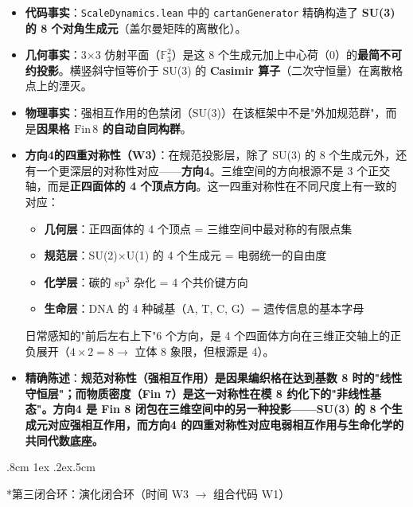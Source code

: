 \documentclass[aps,prd,twocolumn,nofootinbib,floatfix]{revtex4-2}
\makeatletter
\def\subsubsection{%
  \@startsection{subsubsection}{3}{\z@}
    {.8cm \@plus1ex \@minus .2ex}{.5cm}
    {\normalfont\normalsize\bfseries\itshape\raggedright}%
}
\makeatother
\begin{document}
\begin{itemize}
    \item \textbf{代码事实}：\texttt{ScaleDynamics.lean} 中的 \texttt{cartanGenerator} 精确构造了 \textbf{SU(3) 的 8 个对角生成元}（盖尔曼矩阵的离散化）。
    \item \textbf{几何事实}：3$\times$3 仿射平面（$\mathbb{F}_3^2$）是这 8 个生成元加上中心荷（0）的\textbf{最简不可约投影}。横竖斜守恒等价于 SU(3) 的 \textbf{Casimir 算子}（二次守恒量）在离散格点上的湮灭。
    \item \textbf{物理事实}：强相互作用的色禁闭（SU(3)）在该框架中不是"外加规范群"，而是\textbf{因果格 $\text{Fin}\,8$ 的自动自同构群}。
    \item \textbf{方向4的四重对称性（W3）}：在规范投影层，除了 SU(3) 的 8 个生成元外，还有一个更深层的对称性对应——\textbf{方向4}。三维空间的方向根源不是 3 个正交轴，而是\textbf{正四面体的 4 个顶点方向}。这一四重对称性在不同尺度上有一致的对应：
    \begin{itemize}
        \item \textbf{几何层}：正四面体的 4 个顶点 = 三维空间中最对称的有限点集
        \item \textbf{规范层}：SU(2)$\times$U(1) 的 4 个生成元 = 电弱统一的自由度
        \item \textbf{化学层}：碳的 sp$^3$ 杂化 = 4 个共价键方向
        \item \textbf{生命层}：DNA 的 4 种碱基（A, T, C, G）= 遗传信息的基本字母
    \end{itemize}
    日常感知的"前后左右上下"6 个方向，是 4 个四面体方向在三维正交轴上的正负展开（$4 \times 2 = 8 \to$ 立体 8 象限，但根源是 4）。
    \item \textbf{精确陈述}：\textbf{规范对称性（强相互作用）是因果编织格在达到基数 8 时的"线性守恒层"；而物质密度（Fin 7）是这一对称性在模 8 约化下的"非线性基态"。方向4 是 Fin 8 闭包在三维空间中的另一种投影——SU(3) 的 8 个生成元对应强相互作用，而方向4 的四重对称性对应电弱相互作用与生命化学的共同代数底座。}
\end{itemize}

\subsubsection*{第三闭合环：演化闭合环（时间 W3 $\to$ 组合代码 W1）}
\end{document}
